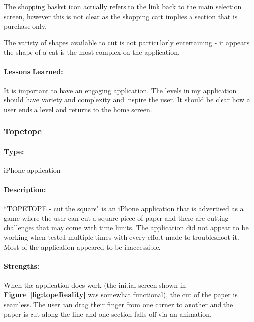 \documentclass[11pt]{article}
\begin{document}
                The shopping basket icon actually refers to the link back to the main selection screen, however this is not clear as the shopping cart implies a section that is purchase only. 
                
                The variety of shapes available to cut is not particularly entertaining - it appears the shape of a cat is the most complex on the application.
                
                \paragraph{Lessons Learned:}
                
                It is important to have an engaging application. The levels in my application should have variety and complexity and inspire the user. It should be clear how a user ends a level and returns to the home screen.
                
                \subsubsection{Topetope}
                 
                \paragraph{Type:} iPhone application %

                \paragraph{Description:}
                ``TOPETOPE - cut the square" is an iPhone application that is advertised as a game where the user can cut a square piece of paper and there are cutting challenges that may come with time limits. The application did not appear to be working when tested multiple times with every effort made to troubleshoot it. Most of the application appeared to be inaccessible. 
                
                \paragraph{Strengths:}
                When the application does work (the initial screen shown in \textbf{Figure~\ref{fig:topeReality}} was somewhat functional), the cut of the paper is seamless. The user can drag their finger from one corner to another and the paper is cut along the line and one section falls off via an animation.
                
\end{document}
